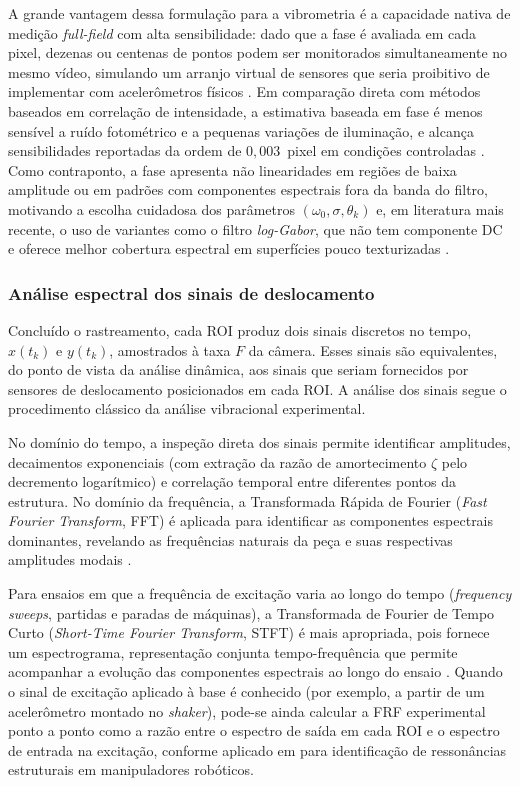 \documentclass[a4paper,10pt,twocolumn]{article}
\begin{document}
A grande vantagem dessa formulação para a vibrometria é a capacidade nativa de medição \textit{full-field} com alta sensibilidade: dado que a fase é avaliada em cada pixel, dezenas ou centenas de pontos podem ser monitorados simultaneamente no mesmo vídeo, simulando um arranjo virtual de sensores que seria proibitivo de implementar com acelerômetros físicos \cite{robotcamera2025}. Em comparação direta com métodos baseados em correlação de intensidade, a estimativa baseada em fase é menos sensível a ruído fotométrico e a pequenas variações de iluminação, e alcança sensibilidades reportadas da ordem de $0,003$~pixel em condições controladas \cite{ZhangLogGabor2024}. Como contraponto, a fase apresenta não linearidades em regiões de baixa amplitude ou em padrões com componentes espectrais fora da banda do filtro, motivando a escolha cuidadosa dos parâmetros $(\omega_0, \sigma, \theta_k)$ e, em literatura mais recente, o uso de variantes como o filtro \textit{log-Gabor}, que não tem componente DC e oferece melhor cobertura espectral em superfícies pouco texturizadas \cite{WangLogGabor2022, ZhangLogGabor2024}.

\subsubsection{Análise espectral dos sinais de deslocamento}

Concluído o rastreamento, cada ROI produz dois sinais discretos no tempo, $x(t_k)$ e $y(t_k)$, amostrados à taxa $F$ da câmera. Esses sinais são equivalentes, do ponto de vista da análise dinâmica, aos sinais que seriam fornecidos por sensores de deslocamento posicionados em cada ROI. A análise dos sinais segue o procedimento clássico da análise vibracional experimental.

No domínio do tempo, a inspeção direta dos sinais permite identificar amplitudes, decaimentos exponenciais (com extração da razão de amortecimento $\zeta$ pelo decremento logarítmico) e correlação temporal entre diferentes pontos da estrutura. No domínio da frequência, a Transformada Rápida de Fourier (\textit{Fast Fourier Transform}, FFT) é aplicada para identificar as componentes espectrais dominantes, revelando as frequências naturais da peça e suas respectivas amplitudes modais \cite{Mhatre2026}.

Para ensaios em que a frequência de excitação varia ao longo do tempo (\textit{frequency sweeps}, partidas e paradas de máquinas), a Transformada de Fourier de Tempo Curto (\textit{Short-Time Fourier Transform}, STFT) é mais apropriada, pois fornece um espectrograma, representação conjunta tempo-frequência que permite acompanhar a evolução das componentes espectrais ao longo do ensaio \cite{robotcamera2025}. Quando o sinal de excitação aplicado à base é conhecido (por exemplo, a partir de um acelerômetro montado no \textit{shaker}), pode-se ainda calcular a FRF experimental ponto a ponto como a razão entre o espectro de saída em cada ROI e o espectro de entrada na excitação, conforme aplicado em \cite{robotcamera2025} para identificação de ressonâncias estruturais em manipuladores robóticos.
\end{document}
